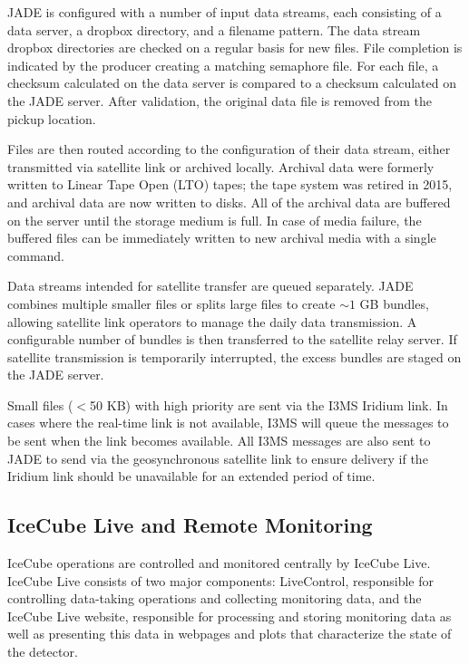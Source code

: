 JADE is configured with a number of input data streams, 
each consisting of a data server, a dropbox directory, and a filename pattern.  The
data stream dropbox directories are checked on a regular basis for new
files.  File completion is indicated by the producer creating a matching
semaphore file.  For each file, a
checksum calculated on the data server is compared to a checksum calculated
on the JADE server.  After validation, the original data file is removed
from the pickup location. 

Files are then routed according to the configuration of their
data stream, either transmitted via satellite link or 
archived locally.  Archival data
were formerly written to Linear Tape Open (LTO) tapes; the tape system was
retired in 2015, and archival data are now written to disks.
All of the archival data are buffered on the server until the storage medium
is full. In case of media failure, the buffered files can be 
immediately written to new archival media with a single command.

Data streams intended for satellite transfer are queued separately.  
JADE combines multiple smaller files or splits large files to create $\sim1$
GB bundles, allowing satellite link operators to manage the daily data
transmission.  A configurable number of bundles is then transferred to the
satellite relay server.  If satellite transmission is temporarily
interrupted, the excess bundles are staged on the JADE server. 

Small files ($<$50 KB) with high priority are sent via
the I3MS Iridium link.  In cases where the real-time link is not available, I3MS
will queue the messages to be sent when the link becomes available. All
I3MS messages are also sent to JADE to send via the geosynchronous satellite link to
ensure delivery if the Iridium link should be unavailable for an extended
period of time.

\subsection{\label{sec:online:icecubelive}IceCube Live and Remote Monitoring}

IceCube operations are controlled and monitored centrally by IceCube Live.
IceCube Live consists of two major components: LiveControl,
responsible for controlling data-taking operations and collecting
monitoring data, and the IceCube Live website, responsible for processing
and storing monitoring data as well as presenting this data in webpages and
plots that characterize the state of the detector.

